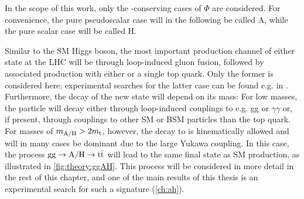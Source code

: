 In the scope of this work, only the \CP-conserving cases of $\Phi$ are considered. For convenience, the pure pseudoscalar case will in the following be called A, while the pure scalar case will be called H.

Similar to the SM Higgs boson, the most important production channel of either state at the LHC will be through loop-induced gluon fusion, followed by associated production with either \ttbar or a single top quark. Only the former is considered here; experimental searches for the latter case can be found e.g. in . Furthermore, the decay of the new state will depend on its mass: For low masses, the particle will decay either through loop-induced couplings to e.g. gg or $\gamma \gamma$ or, if present, through couplings to other SM or BSM particles than the top quark. For masses of $m_{\mathrm{A/H}} > 2 m_{\mathrm{t}}$, however, the decay to \ttbar is kinematically allowed and will in many cases be dominant due to the large Yukawa coupling. In this case, the process $\mathrm{gg \rightarrow A/H \rightarrow \mathrm{t \bar{t}}}$ will lead to the same final state as SM \ttbar production, as illustrated in \cref{fig:theory:ggAH}. This process will be considered in more detail in the rest of this chapter, and one of the main results of this thesis is an experimental search for such a signature (\cref{ch:ah}).



